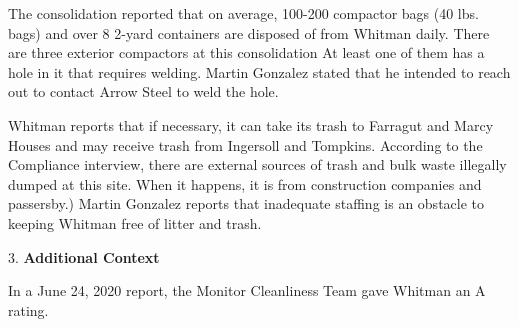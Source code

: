 The consolidation reported that on average, 100-200 compactor bags (40 lbs. bags) and over 8 2-yard containers are disposed of from Whitman daily. There are three exterior compactors at this consolidation At least one of them has a hole in it that requires welding. Martin Gonzalez stated that he intended to reach out to contact Arrow Steel to weld the hole.

Whitman reports that if necessary, it can take its trash to Farragut and Marcy Houses and may receive trash from Ingersoll and Tompkins. According to the Compliance interview, there are external sources of trash and bulk waste illegally dumped at this site. When it happens, it is from construction companies and passersby.) Martin Gonzalez reports that inadequate staffing is an obstacle to keeping Whitman free of litter and trash. 

3. \textbf{Additional Context} 

In a June 24, 2020 report, the Monitor Cleanliness Team gave Whitman an A rating. 